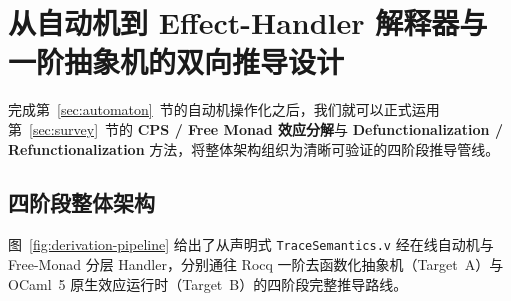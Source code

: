 \documentclass[UTF8,a4paper,11pt,fontset=fandol]{ctexart}
\newcommand{\code}[1]{\texttt{#1}}
\begin{document}
\section{从自动机到 Effect-Handler 解释器与一阶抽象机的双向推导设计}
\label{sec:derivation}

完成第~\ref{sec:automaton}~节的自动机操作化之后，我们就可以正式运用第~\ref{sec:survey}~节的 \textbf{CPS / Free Monad 效应分解}与 \textbf{Defunctionalization / Refunctionalization} 方法，将整体架构组织为清晰可验证的四阶段推导管线。

\subsection{四阶段整体架构}

图~\ref{fig:derivation-pipeline} 给出了从声明式 \code{TraceSemantics.v} 经在线自动机与 Free-Monad 分层 Handler，分别通往 Rocq 一阶去函数化抽象机（Target~A）与 OCaml~5 原生效应运行时（Target~B）的四阶段完整推导路线。
\end{document}
